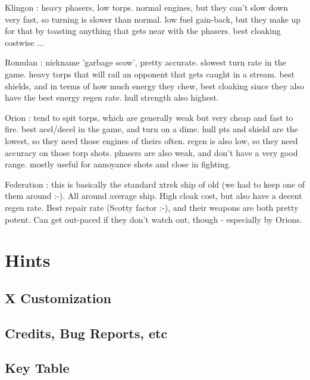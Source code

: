 
Klingon : heavy phasers, low torps. normal engines, but they
can't slow down very fast, so turning is slower than normal. low fuel
gain-back, but they make up for that by toasting anything that gets
near with the phasers. best cloaking costwise ...

Romulan : nickname 'garbage scow', pretty accurate. slowest
turn rate in the game. heavy torps that will rail an opponent that
gets caught in a stream. best shields, and in terms of how much energy
they chew, best cloaking since they also have the best energy regen
rate. hull strength also highest.

Orion : tend to spit torps, which are generally weak but very
cheap and fast to fire. best acel/decel in the game, and turn on a
dime. hull pts and shield are the lowest, so they need those engines
of theirs often. regen is also low, so they need accuracy on those
torp shots. phasers are also weak, and don't have a very good range.
mostly useful for annoyance shots and close in fighting.

Federation : this is basically the standard xtrek ship of old
(we had to keep one of them around :-). All around average ship. High
cloak cost, but also have a decent regen rate. Best repair rate
(Scotty factor :-), and their weapons are both pretty potent. Can get
out-paced if they don't watch out, though - especially by Orions.





\section{Hints}
\subsection{X Customization}
\subsection{Credits, Bug Reports, etc}
\subsection{Key Table}


